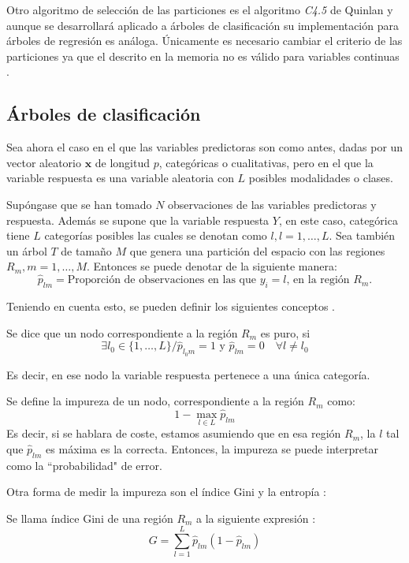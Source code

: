 \noindent Otro algoritmo de selección de las particiones es el algoritmo \emph{C4.5} de Quinlan y aunque se desarrollará aplicado a árboles de clasificación su implementación para árboles de regresión es análoga.  Únicamente es necesario cambiar el criterio de las particiones ya que el descrito en la memoria no es válido para variables continuas \cite{Quinlan 2014}. 

\subsection{Árboles de clasificación}

\noindent Sea ahora el caso en el que las variables predictoras son como antes, dadas por un vector aleatorio $\mathbf{x}$ de longitud $p$, categóricas o cualitativas, pero en el que la variable respuesta es una variable aleatoria con $L$ posibles modalidades o clases.

\noindent Supóngase que se han tomado $N$ observaciones de las variables predictoras y respuesta. Además se supone que la variable respuesta $Y$, en este caso, categórica tiene $L$ categorías posibles las cuales se denotan como $l, l=1,\ldots,L$. Sea también un árbol $T$ de tamaño $M$ que genera una partición del espacio con las regiones $R_m, m=1,\ldots, M$. Entonces se puede denotar de la siguiente manera: 
\begin{equation}
\hat{p}_{lm}=\text{Proporción de observaciones en las que $y_i=l$, en la región $R_m$.}
\end{equation}

\noindent Teniendo en cuenta esto, se pueden definir los siguientes conceptos \cite{ Brown 2004, Divakaran 2022, Hastie 2001, James 2013}.
\begin{defi}
Se dice que un nodo correspondiente a la región $R_m$ es puro, si 
\begin{equation}
\exists l_0\in \lbrace 1,\ldots, L\rbrace/ \hat{p}_{l_0 m}=1 \text{ y }\hat{p}_{lm}=0 \quad \forall l\neq l_0 
\end{equation}

\noindent Es decir, en ese nodo la variable respuesta pertenece a una única categoría. 
\end{defi}

\begin{defi}
Se define la impureza de un nodo, correspondiente a la región $R_m$ como:
\begin{equation}
1-\max_{l\in L} \hat{p}_{lm}
\end{equation}
\noindent Es decir, si se hablara de coste, estamos asumiendo que en esa región $R_m$, la $l$ tal que $\hat{p}_{lm}$ es máxima es la correcta. Entonces, la impureza se puede interpretar como la ``probabilidad" de error. 
\end{defi}
\noindent Otra forma de medir la impureza son el índice Gini y la entropía \cite{Hastie 2001, Divakaran 2022, James 2013}:
\begin{defi}
Se llama índice Gini de una región $R_m$ a la siguiente expresión :
\begin{equation}
G=\sum_{l=1}^L\hat{p}_{lm}(1-\hat{p}_{lm})
\end{equation}
\end{defi} 

